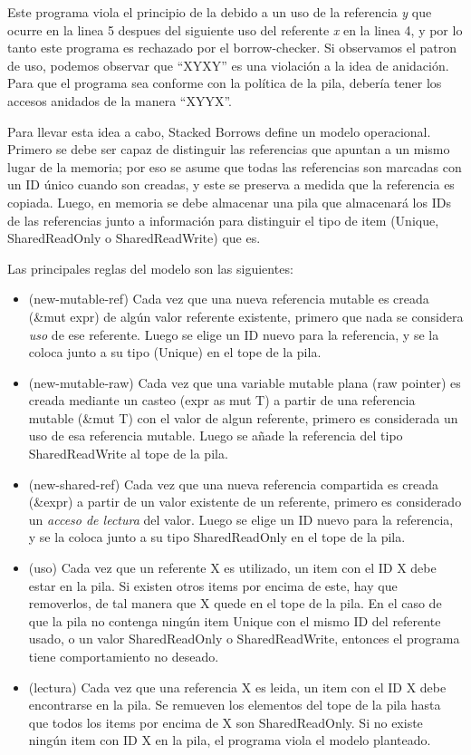 Este programa viola el principio de la debido a un uso de la referencia \textit{y} que ocurre en la linea 5 despues del siguiente uso del referente \textit{x} en la linea 4, y por lo tanto este programa es rechazado por el borrow-checker. Si observamos el patron de uso, podemos observar que ``XYXY'' es una violación a la idea de anidación. Para que el programa sea conforme con la política de la pila, debería tener los accesos anidados de la manera ``XYYX''.

Para llevar esta idea a cabo, Stacked Borrows define un modelo operacional. Primero se debe ser capaz de distinguir las referencias que apuntan a un mismo lugar de la memoria; por eso se asume que todas las referencias son marcadas con un ID único cuando son creadas, y este se preserva a medida que la referencia es copiada. Luego, en memoria se debe almacenar una pila que almacenará los IDs de las referencias junto a información para distinguir el tipo de item (Unique, SharedReadOnly o SharedReadWrite) que es.

Las principales reglas del modelo \label{stackedrules} son las siguientes:
\begin{itemize}
    \item (new-mutable-ref) Cada vez que una nueva referencia mutable es creada (\&mut expr) de algún valor referente existente, primero que nada se considera \textit{uso} de ese referente. Luego se elige un ID nuevo para la referencia, y se la coloca junto a su tipo (Unique) en el tope de la pila.
    \item (new-mutable-raw) Cada vez que una variable mutable plana (raw pointer) es creada mediante un casteo (expr as \*mut T) a partir de una referencia mutable (\&mut T) con el valor de algun referente, primero es considerada un uso de esa referencia mutable. Luego se añade la referencia del tipo SharedReadWrite al tope de la pila.
    \item (new-shared-ref) Cada vez que una nueva referencia compartida es creada (\&expr) a partir de un valor existente de un referente, primero es considerado un \textit{acceso de lectura} del valor. Luego se elige un ID nuevo para la referencia, y se la coloca junto a su tipo SharedReadOnly en el tope de la pila.
    \item (uso) Cada vez que un referente X es utilizado, un item con el ID X debe estar en la pila. Si existen otros items por encima de este, hay que removerlos, de tal manera que X quede en el tope de la pila. En el caso de que la pila no contenga ningún item Unique con el mismo ID del referente usado, o un valor SharedReadOnly o SharedReadWrite, entonces el programa tiene comportamiento no deseado.
    \item (lectura) Cada vez que una referencia X es leida, un item con el ID X debe encontrarse en la pila. Se remueven los elementos del tope de la pila hasta que todos los items por encima de X son SharedReadOnly. Si no existe ningún item con ID X en la pila, el programa viola el modelo planteado.
\end{itemize}

